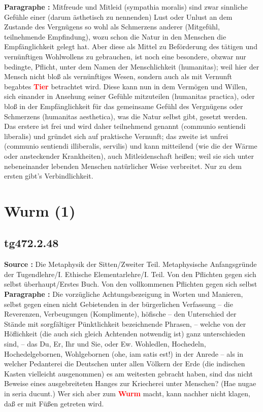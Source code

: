\documentclass[a4paper,12pt,twoside]{book}
\newcommand{\match}[1]{\textcolor{red}{\textbf{#1}}}
\newcommand{\unnumberedsection}[1]{
	\section*{#1}
	\addcontentsline{toc}{section}{#1}
	\markright{#1}
}
\begin{document}
	\textbf{Paragraphe : }
	Mitfreude und Mitleid (sympathia moralis) sind zwar sinnliche Gefühle einer (darum ästhetisch zu nennenden) Lust oder Unlust an dem Zustande des Vergnügens so wohl als Schmerzens anderer (Mitgefühl, teilnehmende Empfindung), wozu schon die Natur in den Menschen die Empfänglichkeit gelegt hat. Aber diese als Mittel zu Beförderung des tätigen und vernünftigen Wohlwollens zu gebrauchen, ist noch eine besondere, obzwar nur bedingte, Pflicht, unter dem Namen der Menschlichkeit (humanitas); weil hier der Mensch nicht bloß als vernünftiges Wesen, sondern  auch als mit Vernunft begabtes \match{Tier} betrachtet wird. Diese kann nun in dem Vermögen und Willen, sich einander in Ansehung seiner Gefühle mitzuteilen (humanitas practica), oder bloß in der Empfänglichkeit für das gemeinsame Gefühl des Vergnügens oder Schmerzens (humanitas aesthetica), was die Natur selbst gibt, gesetzt werden. Das erstere ist frei und wird daher teilnehmend genannt (communio sentiendi liberalis) und gründet sich auf praktische Vernunft; das zweite ist unfrei (communio sentiendi illiberalis, servilis) und kann mitteilend (wie die der Wärme oder ansteckender Krankheiten), auch Mitleidenschaft heißen; weil sie sich unter nebeneinander lebenden Menschen natürlicher Weise verbreitet. Nur zu dem ersten gibt's Verbindlichkeit. 
	
	\unnumberedsection{Wurm (1)} 
	\subsection*{tg472.2.48} 
	\textbf{Source : }Die Metaphysik der Sitten/Zweiter Teil. Metaphysische Anfangsgründe der Tugendlehre/I. Ethische Elementarlehre/I. Teil. Von den Pflichten gegen sich selbst überhaupt/Erstes Buch. Von den vollkommenen Pflichten gegen sich selbst\\  
	
	\textbf{Paragraphe : }Die vorzügliche Achtungsbezeigung in Worten und Manieren, selbst gegen einen nicht Gebietenden in der bürgerlichen Verfassung – die Reverenzen, Verbeugungen (Komplimente), höfische – den Unterschied der Stände mit sorgfältiger Pünktlichkeit bezeichnende Phrasen, – welche von der Höflichkeit (die auch sich gleich Achtenden notwendig ist) ganz unterschieden sind, – das Du, Er, Ihr und Sie, oder Ew. Wohledlen, Hochedeln, Hochedelgebornen, Wohlgebornen (ohe, iam satis est!) in der Anrede – als in welcher Pedanterei die Deutschen unter allen Völkern der Erde (die indischen Kasten vielleicht ausgenommen) es am weitesten gebracht haben, sind das nicht Beweise eines ausgebreiteten Hanges zur Kriecherei unter Menschen? (Hae nugae in seria ducunt.) Wer sich aber zum \match{Wurm} macht, kann nachher nicht klagen, daß er mit Füßen getreten wird. 
	
\end{document}
